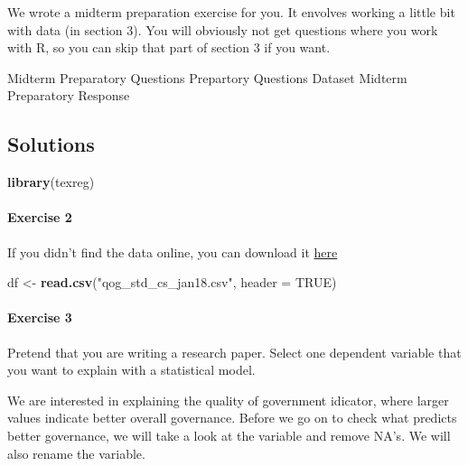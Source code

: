 \documentclass[]{article}
\newenvironment{Shaded}{\begin{snugshade}}{\end{snugshade}}
\newcommand{\KeywordTok}[1]{\textcolor[rgb]{0.13,0.29,0.53}{\textbf{#1}}}
\newcommand{\DataTypeTok}[1]{\textcolor[rgb]{0.13,0.29,0.53}{#1}}
\newcommand{\StringTok}[1]{\textcolor[rgb]{0.31,0.60,0.02}{#1}}
\newcommand{\CommentTok}[1]{\textcolor[rgb]{0.56,0.35,0.01}{\textit{#1}}}
\newcommand{\OtherTok}[1]{\textcolor[rgb]{0.56,0.35,0.01}{#1}}
\newcommand{\OperatorTok}[1]{\textcolor[rgb]{0.81,0.36,0.00}{\textbf{#1}}}
\newcommand{\NormalTok}[1]{#1}
\let\oldparagraph\paragraph
\renewcommand{\paragraph}[1]{\oldparagraph{#1}\mbox{}}
\theoremstyle{definition}
\theoremstyle{definition}
\theoremstyle{definition}
\theoremstyle{remark}
\begin{document}
We wrote a midterm preparation exercise for you. It envolves working a
little bit with data (in section 3). You will obviously not get
questions where you work with R, so you can skip that part of section 3
if you want.

Midterm Preparatory Questions Prepartory Questions Dataset Midterm
Preparatory Response

\subsection{Solutions}\label{solutions-6}

\begin{Shaded}
\begin{Highlighting}[]
\KeywordTok{library}\NormalTok{(texreg)}
\end{Highlighting}
\end{Shaded}

\paragraph{Exercise 2}\label{exercise-2-4}

If you didn't find the data online, you can download it
\href{https://github.com/philippbroniecki/statistics1/blob/master/data/qog_std_cs_jan18.csv?raw=TRUE}{here}

\begin{Shaded}
\begin{Highlighting}[]
\NormalTok{df <-}\StringTok{ }\KeywordTok{read.csv}\NormalTok{(}\StringTok{"qog_std_cs_jan18.csv"}\NormalTok{, }\DataTypeTok{header =} \OtherTok{TRUE}\NormalTok{)}
\end{Highlighting}
\end{Shaded}

\paragraph{Exercise 3}\label{exercise-3-6}

Pretend that you are writing a research paper. Select one dependent
variable that you want to explain with a statistical model.

We are interested in explaining the quality of government idicator,
where larger values indicate better overall governance. Before we go on
to check what predicts better governance, we will take a look at the
variable and remove NA's. We will also rename the variable.

\begin{Shaded}
\end{Shaded}
\end{document}
